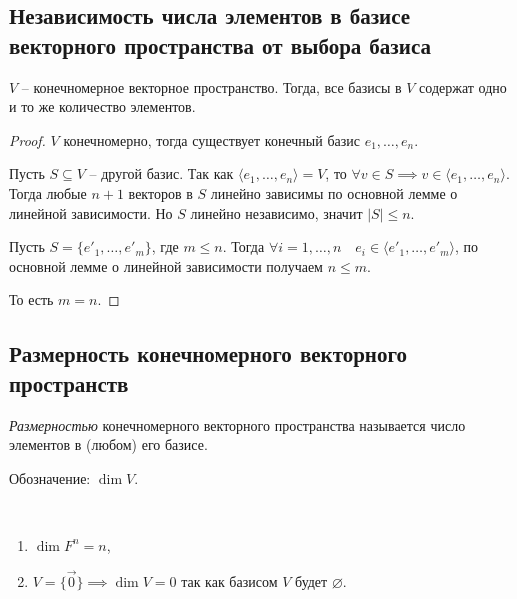 \subsection{Независимость числа элементов в базисе векторного пространства от выбора базиса}

\begin{proposal}
    $V$ -- конечномерное векторное пространство. Тогда, все базисы в $V$ содержат одно и то же количество элементов.
\end{proposal}

\begin{proof}
    $V$ конечномерно, тогда существует конечный базис $e_1, \dots, e_n$.

    Пусть $S \subseteq V$ -- другой базис. 
    Так как $\langle e_1, \dots, e_n \rangle = V$, то $\forall v \in S \implies v \in \langle e_1, \dots, e_n \rangle$. 
    Тогда любые $n + 1$ векторов в $S$ линейно зависимы по основной лемме о линейной зависимости.  Но $S$ линейно независимо, значит $|S| \leq n$.

    Пусть $S = \{e'_1, \dots, e'_m\}$, где $m \leq n$. Тогда $\forall i = 1, \dots, n \quad e_i \in \langle e'_1, \dots, e'_m \rangle$, по основной лемме о линейной зависимости получаем $n \leq m$.
    
    То есть $m = n$.
\end{proof}


\subsection{Размерность конечномерного векторного пространств}

\begin{definition}
    \textit{Размерностью} конечномерного векторного пространства называется число элементов в (любом) его базисе.

    Обозначение: $\dim V$.
\end{definition}

\begin{example}~
    \begin{enumerate}
    \item $\dim F^n = n$,
    \item $V = \{\overrightarrow{0}\} \implies \dim V = 0$ так как базисом $V$ будет $\varnothing$.
    \end{enumerate}
\end{example}

